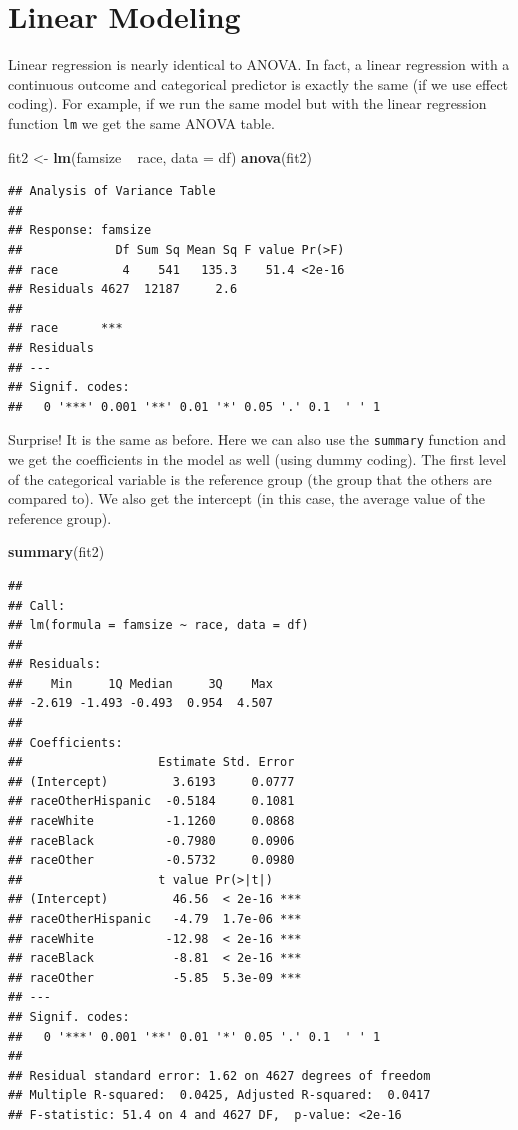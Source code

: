 \documentclass[]{tufte-book}
\newenvironment{Shaded}{}{}
\newcommand{\KeywordTok}[1]{\textcolor[rgb]{0.00,0.44,0.13}{\textbf{#1}}}
\newcommand{\DataTypeTok}[1]{\textcolor[rgb]{0.56,0.13,0.00}{#1}}
\newcommand{\StringTok}[1]{\textcolor[rgb]{0.25,0.44,0.63}{#1}}
\newcommand{\OperatorTok}[1]{\textcolor[rgb]{0.40,0.40,0.40}{#1}}
\newcommand{\NormalTok}[1]{#1}
\theoremstyle{definition}
\theoremstyle{definition}
\theoremstyle{remark}
\begin{document}
\section*{Linear Modeling}\label{linear-modeling}

Linear regression is nearly identical to ANOVA. In fact, a linear
regression with a continuous outcome and categorical predictor is
exactly the same (if we use effect coding). For example, if we run the
same model but with the linear regression function \texttt{lm} we get
the same ANOVA table.

\begin{Shaded}
\begin{Highlighting}[]
\NormalTok{fit2 <-}\StringTok{ }\KeywordTok{lm}\NormalTok{(famsize }\OperatorTok{~}\StringTok{ }\NormalTok{race, }\DataTypeTok{data =}\NormalTok{ df)}
\KeywordTok{anova}\NormalTok{(fit2)}
\end{Highlighting}
\end{Shaded}

\begin{verbatim}
## Analysis of Variance Table
## 
## Response: famsize
##             Df Sum Sq Mean Sq F value Pr(>F)
## race         4    541   135.3    51.4 <2e-16
## Residuals 4627  12187     2.6               
##              
## race      ***
## Residuals    
## ---
## Signif. codes:  
##   0 '***' 0.001 '**' 0.01 '*' 0.05 '.' 0.1  ' ' 1
\end{verbatim}

Surprise! It is the same as before. Here we can also use the
\texttt{summary} function and we get the coefficients in the model as
well (using dummy coding). The first level of the categorical variable
is the reference group (the group that the others are compared to). We
also get the intercept (in this case, the average value of the reference
group).

\begin{Shaded}
\begin{Highlighting}[]
\KeywordTok{summary}\NormalTok{(fit2)}
\end{Highlighting}
\end{Shaded}

\begin{verbatim}
## 
## Call:
## lm(formula = famsize ~ race, data = df)
## 
## Residuals:
##    Min     1Q Median     3Q    Max 
## -2.619 -1.493 -0.493  0.954  4.507 
## 
## Coefficients:
##                   Estimate Std. Error
## (Intercept)         3.6193     0.0777
## raceOtherHispanic  -0.5184     0.1081
## raceWhite          -1.1260     0.0868
## raceBlack          -0.7980     0.0906
## raceOther          -0.5732     0.0980
##                   t value Pr(>|t|)    
## (Intercept)         46.56  < 2e-16 ***
## raceOtherHispanic   -4.79  1.7e-06 ***
## raceWhite          -12.98  < 2e-16 ***
## raceBlack           -8.81  < 2e-16 ***
## raceOther           -5.85  5.3e-09 ***
## ---
## Signif. codes:  
##   0 '***' 0.001 '**' 0.01 '*' 0.05 '.' 0.1  ' ' 1
## 
## Residual standard error: 1.62 on 4627 degrees of freedom
## Multiple R-squared:  0.0425, Adjusted R-squared:  0.0417 
## F-statistic: 51.4 on 4 and 4627 DF,  p-value: <2e-16
\end{verbatim}
\end{document}
